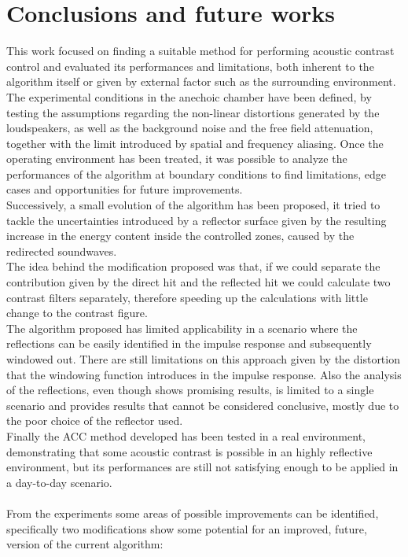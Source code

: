 \chapter{Conclusions and future works} %

\label{Chapter5} %

This work focused on finding a suitable method for performing acoustic contrast control and evaluated its performances and limitations, both inherent to the algorithm itself or given by external factor such as the surrounding environment.
\\
The experimental conditions in the anechoic chamber have been defined, by testing the assumptions regarding the non-linear distortions generated by the loudspeakers, as well as the background noise and the free field attenuation, together with the limit introduced by spatial and frequency aliasing. Once the operating environment has been treated, it was possible to analyze the performances of the algorithm at boundary conditions to find limitations, edge cases and opportunities for future improvements.
\\
Successively, a small evolution of the algorithm has been proposed, it tried to tackle the uncertainties introduced by a reflector surface given by the resulting increase in the energy content inside the controlled zones, caused by the redirected soundwaves.
\\
The idea behind the modification proposed was that, if we could separate the contribution given by the direct hit and the reflected hit we could calculate two contrast filters separately, therefore speeding up the calculations with little change to the contrast figure.
\\
The algorithm proposed has limited applicability in a scenario where the reflections can be easily identified in the impulse response and subsequently windowed out. There are still limitations on this approach given by the distortion that the windowing function introduces in the impulse response. Also the analysis of the reflections, even though shows promising results, is limited to a single scenario and provides results that cannot be considered conclusive, mostly due to the poor choice of the reflector used.
\\
Finally the ACC method developed has been tested in a real environment, demonstrating that some acoustic contrast is possible in an highly reflective environment, but its performances are still not satisfying enough to be applied in a day-to-day scenario.
\\
\\
From the experiments some areas of possible improvements can be identified, specifically two modifications show some potential for an improved, future, version of the current algorithm:

